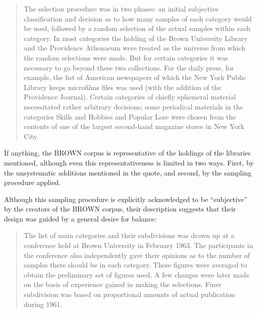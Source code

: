 \begin{quotation}
The selection procedure was in two phases: an initial subjective classification and decision as to how many samples  of each category would be used, followed by a random  selection of the actual samples within each category. In most categories the holding of the Brown University Library and the Providence Athenaeum were treated as the universe from which the random selections were made. But for certain categories it was necessary to go beyond these two collections. For the daily press, for example, the list of American newspapers  of which the New York Public Library keeps microfilms files was used (with the addition of the Providence Journal). Certain categories of chiefly ephemeral material necessitated rather arbitrary decisions; some periodical materials in the categories Skills and Hobbies and Popular Lore were chosen from the contents of one of the largest second\hyp{}hand magazine stores in New York City. \citep{francis_manual_1979}
\end{quotation}

If anything, the BROWN  corpus is representative  of the holdings of the libraries mentioned, although even this representativeness is limited in two ways. First, by the unsystematic additions mentioned in the quote, and second, by the sampling  procedure applied.

Although this sampling  procedure is explicitly acknowledged to be ``subjective'' by the creators of the BROWN  corpus, their description suggests that their design  was guided by a general desire for balance:

\begin{quotation}
The list of main categories  and their subdivisions was drawn up at a conference held at Brown University in February 1963. The participants in the conference also independently gave their opinions as to the number of samples there should be in each category. These figures were averaged to obtain the preliminary set of figures used. A few changes were later made on the basis of experience gained in making the selections. Finer subdivision was based on proportional amounts of actual publication during 1961. \citep{francis_manual_1979}
\end{quotation}

